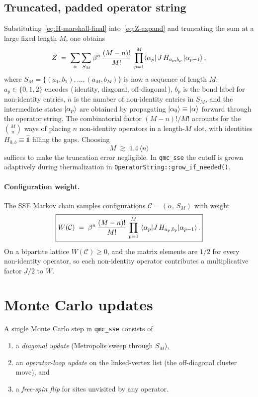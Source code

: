 \documentclass[11pt,a4paper]{article}
\newcommand{\Iop}{\hat{\mathbb 1}}
\theoremstyle{definition}
\theoremstyle{plain}
\begin{document}
\subsection{Truncated, padded operator string}\label{sec:string}
Substituting~\cref{eq:H-marshall-final} into~\cref{eq:Z-expand} and
truncating the sum at a large fixed length $M$, one obtains
\begin{equation}\label{eq:Z-SSE}
    Z \;=\; \sum_{\alpha}\sum_{S_M}
            \beta^n\,\frac{(M-n)!}{M!}\;
            \prod_{p=1}^{M}\!\!\mel{\alpha_p}{\,J\,H_{a_p,b_p}\,}{\alpha_{p-1}},
\end{equation}
where $S_M=\{(a_1,b_1),\dots,(a_M,b_M)\}$ is now a sequence of length
$M$, $a_p\in\{0,1,2\}$ encodes (\,identity, diagonal, off-diagonal\,),
$b_p$ is the bond label for non-identity entries, $n$ is the number
of non-identity entries in $S_M$, and the intermediate states
$\ket{\alpha_p}$ are obtained by propagating $\ket{\alpha_0}\equiv
\ket\alpha$ forward through the operator string. The combinatorial
factor $(M-n)!/M!$ accounts for the $\binom{M}{n}$ ways of placing
$n$ non-identity operators in a length-$M$ slot, with identities
$H_{0,b}\equiv\Iop$ filling the gaps. Choosing
\begin{equation}\label{eq:Mgrowth}
    M \;\gtrsim\; 1.4\,\langle n \rangle
\end{equation}
suffices to make the truncation error negligible. In
\texttt{qmc\_sse} the cutoff is grown adaptively during thermalization
in \lstinline|OperatorString::grow_if_needed()|.

\paragraph{Configuration weight.}
The SSE Markov chain samples configurations
$\mathcal C = (\alpha,\,S_M)$ with weight
\begin{equation}\boxed{
    W(\mathcal C) \;=\; \beta^n\,\frac{(M-n)!}{M!}\,
                       \prod_{p=1}^M \mel{\alpha_p}{J\,H_{a_p,b_p}}{\alpha_{p-1}}.}
    \label{eq:W}
\end{equation}
On a bipartite lattice $W(\mathcal C)\ge 0$, and the matrix elements
are $1/2$ for every non-identity operator, so each non-identity
operator contributes a multiplicative factor $J/2$ to $W$.

\section{Monte Carlo updates}\label{sec:updates}
A single Monte Carlo step in \texttt{qmc\_sse} consists of
\begin{enumerate}[label=(\roman*)]
    \item a \emph{diagonal update} (Metropolis sweep through $S_M$),
    \item an \emph{operator-loop update} on the linked-vertex list
          (the off-diagonal cluster move), and
    \item a \emph{free-spin flip} for sites unvisited by any operator.
\end{enumerate}
\end{document}
